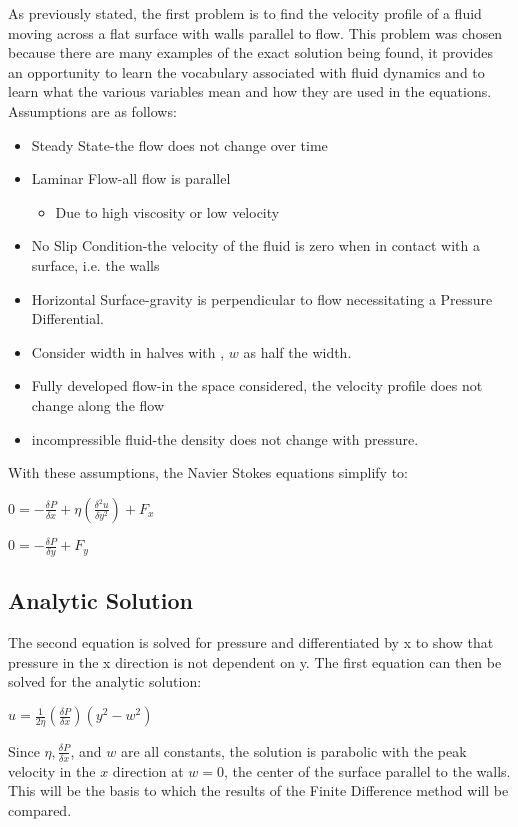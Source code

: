 \documentclass{article}
\begin{document}
As previously stated, the first problem is to find the velocity profile of a fluid moving across a flat surface with walls parallel to flow. This problem was chosen because there are many examples of the exact solution being found, it provides an opportunity to learn the vocabulary associated with fluid dynamics and to learn what the various variables mean and how they are used in the equations. Assumptions are as follows:
\begin{itemize}
	\item Steady State-the flow does not change over time
    \item Laminar Flow-all flow is parallel
    	\begin{itemize}
    		\item Due to high viscosity or low velocity
       	\end{itemize}
       \item No Slip Condition-the velocity of the fluid is zero when in contact with a surface, i.e. the walls
       \item Horizontal Surface-gravity is perpendicular to flow necessitating a Pressure Differential.
       \item Consider width in halves with , $w$ as half the width.
       \item Fully developed flow-in the space considered, the velocity profile does not change along the flow
       \item incompressible fluid-the density does not change with pressure.
\end{itemize}
With these assumptions, the Navier Stokes equations simplify to:
\begin{center}
	 $0=-\frac{\delta P}{\delta x}+\eta(\frac{\delta^{2} u}{\delta y^2})+F_x$
	
	$0=-\frac{\delta P}{\delta y}+F_y$
\end{center}
\subsection{Analytic Solution}
The second equation is solved for pressure and differentiated by x to show that pressure in the x direction is not dependent on y. The first equation can then be solved for the analytic solution:

\begin{center}
	 $u=\frac{1}{2\eta}(\frac{\delta P}{\delta x})(y^{2}-w^{2})$
\end{center}
Since $\eta, \frac{\delta P}{\delta x}$, and $w$ are all constants, the solution is parabolic with the peak velocity in the $x$ direction at $w=0$, the center of the surface parallel to the walls. This will be the basis to which the results of the Finite Difference method will be compared.
\end{document}
